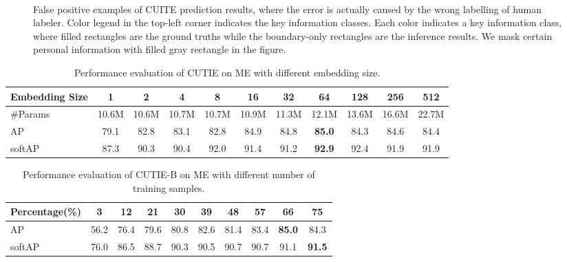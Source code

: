 \documentclass[10pt,twocolumn,letterpaper]{article}
\begin{document}
\begin{figure}
\begin{center}
\\
\end{center}
   \caption{False positive examples of CUITE prediction results, where the error is actually caused by the wrong labelling of human labeler. Color legend in the top-left corner indicates the key information classes. Each color indicates a key information class, where filled rectangles are the ground truths while the boundary-only rectangles are the inference results.  We mask certain personal information with filled gray rectangle in the figure.}
\label{fig:falselabel}
\end{figure}

\begin{table}
	\caption{Performance evaluation of CUTIE on ME with different embedding size.}
\begin{center}
\begin{tabular}{l | c | c | c | c | c | c | c | c | c | c}
	Embedding Size & 1 & 2 & 4 & 8 & 16 & 32 & 64 & 128 & 256 & 512 \\
	\hline
	\#Params & 10.6M & 10.6M & 10.7M & 10.7M & 10.9M & 11.3M & 12.1M & 13.6M & 16.6M & 22.7M \\
	AP & 79.1 & 82.8 & 83.1 & 82.8 & 84.9 & 84.8 & \textbf{85.0} & 84.3 & 84.6 & 84.4 \\
	softAP & 87.3 & 90.3 & 90.4 & 92.0 & 91.4 & 91.2 & \textbf{92.9} & 92.4 & 91.9 & 91.9 \\
\end{tabular}
\end{center}
	\label{tab:embedding}
\end{table}

\begin{table}
	\caption{Performance evaluation of CUTIE-B on ME with different number of training samples.}
\begin{center}
\begin{tabular}{l | c | c | c | c | c | c | c | c | c}
	Percentage(\%) & 3 & 12 & 21 & 30 & 39 & 48 & 57 & 66 & 75 \\
	\hline
	AP & 56.2 & 76.4 & 79.6 & 80.8 & 82.6 & 81.4 & 83.4 & \textbf{85.0} & 84.3 \\
	softAP & 76.0 & 86.5 & 88.7 & 90.3 & 90.5 & 90.7 & 90.7 & 91.1 & \textbf{91.5} \\
\end{tabular}
\end{center}
	\label{tab:samples}
\end{table}
\end{document}
